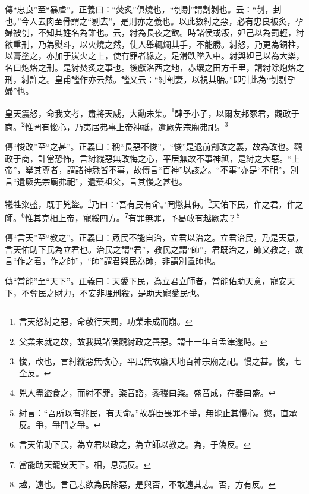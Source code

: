 {\noindent\zhuan{}\fzbyks 傳“忠良”至“暴虐”。正義曰：“焚炙”俱燒也，“刳剔”謂割剝也。云：“刳，刲也。”今人去肉至骨謂之“剔去”，是則亦之義也。以此數紂之惡，必有忠良被炙，孕婦被刳，不知其姓名為誰也。云，紂為長夜之飲。時諸侯或叛，妲己以為罰輕，紂欲重刑，乃為熨斗，以火燒之然，使人舉輒爛其手，不能勝。紂怒，乃更為銅柱，以膏塗之，亦加于炭火之上，使有罪者緣之，足滑跌墜入中。紂與妲己以為大樂，名曰炮烙之刑。是紂焚炙之事也。後獻洛西之地，赤壤之田方千里，請紂除炮烙之刑，紂許之。皇甫謐作亦云然。謐又云：“紂剖妻，以視其胎。”即引此為“刳剔孕婦”也。 \par}

皇天震怒，命我文考，肅將天威，大勳未集。\footnote{言天怒紂之惡，命敬行天罰，功業未成而崩。}肆予小子，以爾友邦冢君，觀政于商。\footnote{父業未就之故，故我與諸侯觀紂政之善惡。謂十一年自孟津還時。}惟罔有悛心，乃夷居弗事上帝神祗，遺厥先宗廟弗祀。\footnote{悛，改也，言紂縱惡無改心，平居無故廢天地百神宗廟之祀。慢之甚。悛，七全反。}

{\noindent\zhuan{}\fzbyks 傳“悛改”至“之甚”。正義曰：稱“長惡不悛”，“悛”是退前創改之義，故為改也。觀政于商，計當恐怖，言紂縱惡無改悔之心，平居無故不事神祗，是紂之大惡。“上帝”，舉其尊者，謂諸神悉皆不事，故傳言“百神”以該之。“不事”亦是“不祀”，別言“遺厥先宗廟弗祀”，遺棄祖父，言其慢之甚也。 \par}

犧牲粢盛，既于兇盜。\footnote{兇人盡盜食之，而紂不罪。粢音諮，黍稷曰粢。盛音成，在器曰盛。}乃曰：‘吾有民有命。’罔懲其侮。\footnote{紂言：“吾所以有兆民，有天命。”故群臣畏罪不爭，無能止其慢心。懲，直承反。爭，爭鬥之爭。}天佑下民，作之君，作之師。\footnote{言天佑助下民，為立君以政之，為立師以教之。為，于偽反。}惟其克相上帝，寵綏四方。\footnote{當能助天寵安天下。相，息亮反。}有罪無罪，予曷敢有越厥志？\footnote{越，遠也。言己志欲為民除惡，是與否，不敢遠其志。否，方有反。}

{\noindent\zhuan{}\fzbyks 傳“言天”至“教之”。正義曰：眾民不能自治，立君以治之。立君治民，乃是天意，言天佑助下民為立君也。治民之謂“君”，教民之謂“師”，君既治之，師又教之，故言“作之君，作之師”，“師”謂君與民為師，非謂別置師也。 \par}

{\noindent\zhuan{}\fzbyks 傳“當能”至“天下”。正義曰：天愛下民，為立君立師者，當能佑助天意，寵安天下，不奪民之財力，不妄非理刑殺，是助天寵愛民也。 \par}


